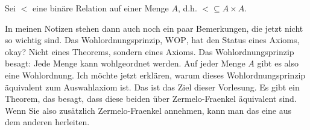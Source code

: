 \begin{math-stroke}[Wohlordnung]
Sei $<$ eine binäre Relation auf einer Menge $A$, d.h. $< \subseteq A \times A$.


\end{math-stroke}

\begin{spoken-clean}[00:25:00 - 00:26:30]
In meinen Notizen stehen dann auch noch ein paar Bemerkungen, die jetzt nicht so wichtig sind. Das Wohlordnungsprinzip, $\text{WOP}$, hat den Status eines Axioms, okay? Nicht eines Theorems, sondern eines Axioms. Das Wohlordnungsprinzip besagt: Jede Menge kann wohlgeordnet werden. Auf jeder Menge $A$ gibt es also eine Wohlordnung. Ich möchte jetzt erklären, warum dieses Wohlordnungsprinzip äquivalent zum Auswahlaxiom ist. Das ist das Ziel dieser Vorlesung. Es gibt ein Theorem, das besagt, dass diese beiden über Zermelo-Fraenkel äquivalent sind. Wenn Sie also zusätzlich Zermelo-Fraenkel annehmen, kann man das eine aus dem anderen herleiten.
\end{spoken-clean}


